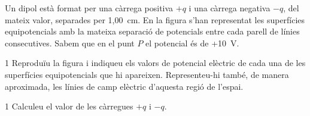 Un dipol està format per una càrrega positiva $+q$ i una càrrega negativa $-q$, del mateix valor, separades per 1,00~cm. En la figura s'han representat les superfícies equipotencials amb la mateixa separació de potencials entre cada parell de línies consecutives. Sabem que en el punt $P$ el potencial és de +10~V.


\begin{apartat}{1}
Reproduïu la figura i indiqueu els valors de potencial elèctric de cada una de les superfícies equipotencials que hi apareixen. Representeu-hi també, de manera aproximada, les línies de camp elèctric d'aquesta regió de l'espai.
\end{apartat}

\begin{apartat}{1}
Calculeu el valor de les càrregues $+q$ i $-q$.
\end{apartat}


